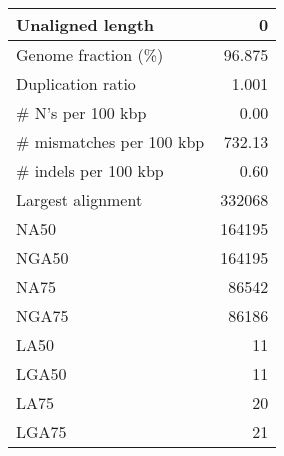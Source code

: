 \documentclass[12pt,a4paper]{article}
\begin{document}
\begin{table}[ht]
\begin{center}
\begin{tabular}{|l*{1}{|r}|}
Unaligned length & 0 \\ \hline
Genome fraction (\%) & 96.875 \\ \hline
Duplication ratio & 1.001 \\ \hline
\# N's per 100 kbp & 0.00 \\ \hline
\# mismatches per 100 kbp & 732.13 \\ \hline
\# indels per 100 kbp & 0.60 \\ \hline
Largest alignment & 332068 \\ \hline
NA50 & 164195 \\ \hline
NGA50 & 164195 \\ \hline
NA75 & 86542 \\ \hline
NGA75 & 86186 \\ \hline
LA50 & 11 \\ \hline
LGA50 & 11 \\ \hline
LA75 & 20 \\ \hline
LGA75 & 21 \\ \hline
\end{tabular}
\end{center}
\end{table}
\end{document}
